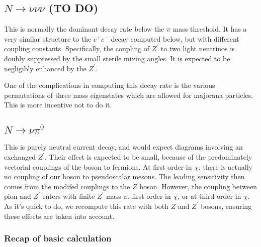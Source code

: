 \documentclass[11pt, a4paper]{article}
\begin{document}
\subsection{$N\to\nu\nu\nu$ (TO DO)}

This is normally the dominant decay rate below the $\pi$ mass threshold.  It
has a very similar structure to the $e^+e^-$ decay computed below, but with
different coupling constants.  Specifically, the coupling of $Z^\prime$ to two
light neutrinos is doubly suppressed by the small sterile mixing angles. It is
expected to be negligibly enhanced by the $Z^\prime$. 

One of the complications in computing this decay rate is the various
permutations of three mass eigenstates which are allowed for majorana
particles. This is more incentive not to do it.


\subsection{$N\to\nu\pi^0$}

This is purely neutral current decay, and would expect diagrams involving an
exchanged $Z^\prime$.
%
Their effect is expected to be small, because of the predominately vectorial
couplings of the boson to fermions. At first order in $\chi$, there is actually
no coupling of our boson to pseudoscalar mesons. The leading sensitivity then
comes from the modifed couplings to the $Z$ boson. However, the coupling
between pion and $Z^\prime$ enters with finite $Z^\prime$ mass at first order
in $\chi$, or at third order in $\chi$. As it's quick to do, we recompute this
rate with both $Z$ and $Z^\prime$ bosons, ensuring these effects are taken into
account.

\subsubsection{Recap of basic calculation}
\end{document}
